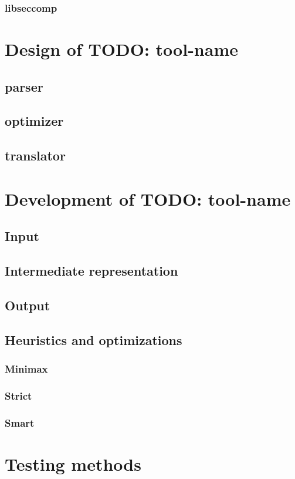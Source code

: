 \subsection{libseccomp}



\chapter{Design of TODO: tool-name}
\section{parser}
\section{optimizer}
\section{translator}



\chapter{Development of TODO: tool-name}
\section{Input}
\section{Intermediate representation}
\section{Output}
\section{Heuristics and optimizations}
\subsection{Minimax}
\subsection{Strict}
\subsection{Smart}


\chapter{Testing methods}



